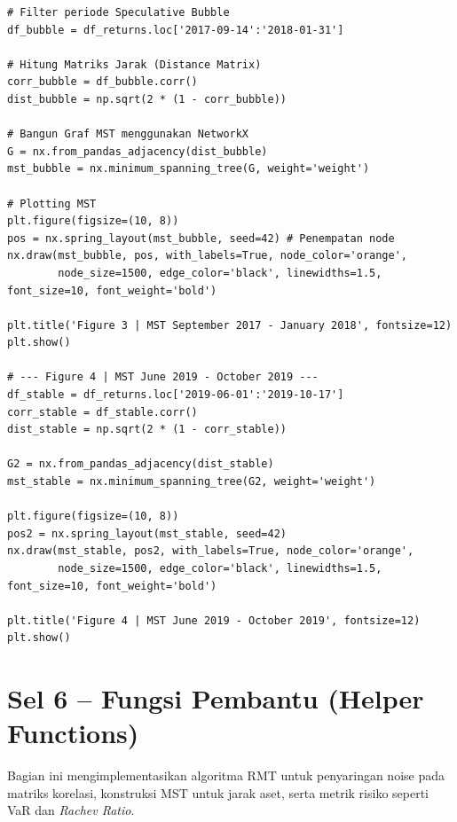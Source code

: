 \documentclass[12pt,a4paper]{article}
\begin{document}
\begin{lstlisting}[caption={Konstruksi dan Plot MST}]
# Filter periode Speculative Bubble
df_bubble = df_returns.loc['2017-09-14':'2018-01-31']

# Hitung Matriks Jarak (Distance Matrix)
corr_bubble = df_bubble.corr()
dist_bubble = np.sqrt(2 * (1 - corr_bubble))

# Bangun Graf MST menggunakan NetworkX
G = nx.from_pandas_adjacency(dist_bubble)
mst_bubble = nx.minimum_spanning_tree(G, weight='weight')

# Plotting MST
plt.figure(figsize=(10, 8))
pos = nx.spring_layout(mst_bubble, seed=42) # Penempatan node
nx.draw(mst_bubble, pos, with_labels=True, node_color='orange', 
        node_size=1500, edge_color='black', linewidths=1.5, font_size=10, font_weight='bold')

plt.title('Figure 3 | MST September 2017 - January 2018', fontsize=12)
plt.show()

# --- Figure 4 | MST June 2019 - October 2019 ---
df_stable = df_returns.loc['2019-06-01':'2019-10-17']
corr_stable = df_stable.corr()
dist_stable = np.sqrt(2 * (1 - corr_stable))

G2 = nx.from_pandas_adjacency(dist_stable)
mst_stable = nx.minimum_spanning_tree(G2, weight='weight')

plt.figure(figsize=(10, 8))
pos2 = nx.spring_layout(mst_stable, seed=42)
nx.draw(mst_stable, pos2, with_labels=True, node_color='orange', 
        node_size=1500, edge_color='black', linewidths=1.5, font_size=10, font_weight='bold')

plt.title('Figure 4 | MST June 2019 - October 2019', fontsize=12)
plt.show()
\end{lstlisting}

\section{Sel 6 -- Fungsi Pembantu (Helper Functions)}
Bagian ini mengimplementasikan algoritma RMT untuk penyaringan noise pada matriks korelasi, konstruksi MST untuk jarak aset, serta metrik risiko seperti VaR dan \textit{Rachev Ratio}.
\end{document}
